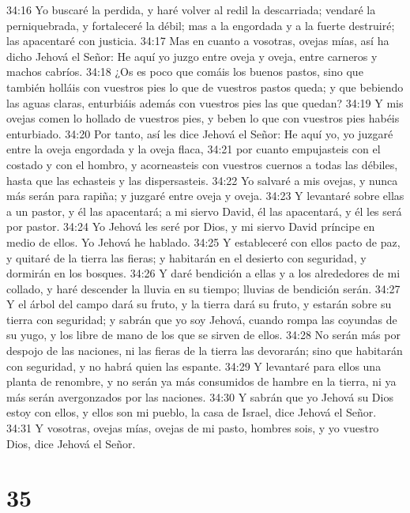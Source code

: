 34:16 Yo buscaré la perdida, y haré volver al redil la descarriada; vendaré la perniquebrada, y fortaleceré la débil; mas a la engordada y a la fuerte destruiré; las apacentaré con justicia.  
34:17 Mas en cuanto a vosotras, ovejas mías, así ha dicho Jehová el Señor: He aquí yo juzgo entre oveja y oveja, entre carneros y machos cabríos.  
34:18 ¿Os es poco que comáis los buenos pastos, sino que también holláis con vuestros pies lo que de vuestros pastos queda; y que bebiendo las aguas claras, enturbiáis además con vuestros pies las que quedan?  
34:19 Y mis ovejas comen lo hollado de vuestros pies, y beben lo que con vuestros pies habéis enturbiado.  
34:20 Por tanto, así les dice Jehová el Señor: He aquí yo, yo juzgaré entre la oveja engordada y la oveja flaca,  
34:21 por cuanto empujasteis con el costado y con el hombro, y acorneasteis con vuestros cuernos a todas las débiles, hasta que las echasteis y las dispersasteis.  
34:22 Yo salvaré a mis ovejas, y nunca más serán para rapiña; y juzgaré entre oveja y oveja.  
34:23 Y levantaré sobre ellas a un pastor, y él las apacentará; a mi siervo David, él las apacentará, y él les será por pastor. 
34:24 Yo Jehová les seré por Dios, y mi siervo David príncipe en medio de ellos. Yo Jehová he hablado.  
34:25 Y estableceré con ellos pacto de paz, y quitaré de la tierra las fieras; y habitarán en el desierto con seguridad, y dormirán en los bosques.  
34:26 Y daré bendición a ellas y a los alrededores de mi collado, y haré descender la lluvia en su tiempo; lluvias de bendición serán.  
34:27 Y el árbol del campo dará su fruto, y la tierra dará su fruto, y estarán sobre su tierra con seguridad; y sabrán que yo soy Jehová, cuando rompa las coyundas de su yugo, y los libre de mano de los que se sirven de ellos.  
34:28 No serán más por despojo de las naciones, ni las fieras de la tierra las devorarán; sino que habitarán con seguridad, y no habrá quien las espante.  
34:29 Y levantaré para ellos una planta de renombre, y no serán ya más consumidos de hambre en la tierra, ni ya más serán avergonzados por las naciones.  
34:30 Y sabrán que yo Jehová su Dios estoy con ellos, y ellos son mi pueblo, la casa de Israel, dice Jehová el Señor.  
34:31 Y vosotras, ovejas mías, ovejas de mi pasto, hombres sois, y yo vuestro Dios, dice Jehová el Señor.  

\chapter{35}


